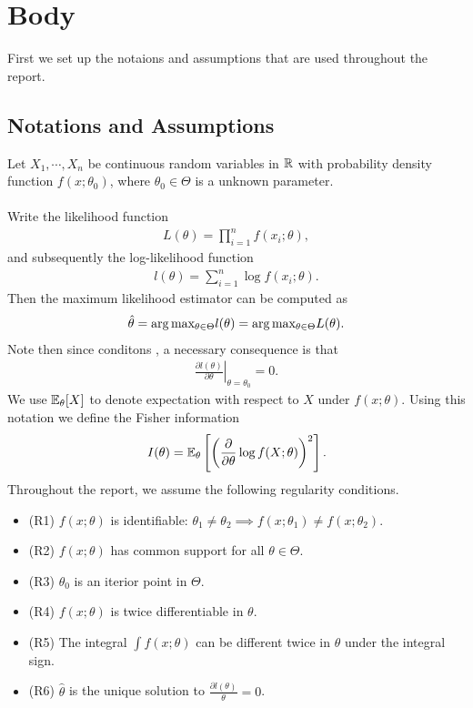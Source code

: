 
\section{Body}
First we set up the notaions and assumptions that are used throughout the report.
\subsection{Notations and Assumptions}
Let $X_1,\cdots,X_n$ be \iid continuous random variables in $\mathbb{R}$ with probability density function $f(x;\theta_0)$, where $\theta_0 \in \Theta$ is a unknown parameter.\\\\
Write the likelihood function
\begin{align}
L(\theta) = \prod_{i=1}^n f(x_i;\theta),
\end{align}
and subsequently the log-likelihood function
\begin{align}
l(\theta) = \sum_{i=1}^n \log f(x_i;\theta).
\end{align}
Then the maximum likelihood estimator can be computed as
\begin{align}
\hat{\theta} = \arg\text{max}_{\theta\in\Theta}l(\theta) = \arg\text{max}_{\theta\in\Theta}L(\theta).
\end{align}
Note then since \bred conditons \ered, a necessary consequence is that
\begin{align}
\left.\frac{\partial l(\theta)}{\partial \theta} \right\vert_{\theta=\theta_0} = 0.
\end{align}
We use $\mathbb{E}_{\theta}[X]$ to denote expectation with respect to $X$ under $f(x;\theta)$. Using this notation we define the Fisher information
\begin{align}
I(\theta) = \mathbb{E}_{\theta}\left[ \left( \frac{\partial}{\partial\theta}\log f(X;\theta) \right)^2 \right]. \label{eqn:fisher}
\end{align}
Throughout the report, we assume the following regularity conditions.
\begin{itemize}
\item (R1) $f(x;\theta)$ is identifiable: $\theta_1\neq\theta_2\implies f(x;\theta_1)\neq f(x;\theta_2)$.
\item (R2) $f(x;\theta)$ has common support for all $\theta\in\Theta$.
\item (R3) $\theta_0$ is an iterior point in $\Theta$.
\item (R4) $f(x;\theta)$ is twice differentiable in $\theta$.
\item (R5) The integral $\int f(x;\theta)$ can be different twice in $\theta$ under the integral sign.
\item (R6) $\hat{\theta}$ is the unique solution to $\frac{\partial l(\theta)}{\theta} = 0$.
\end{itemize}

